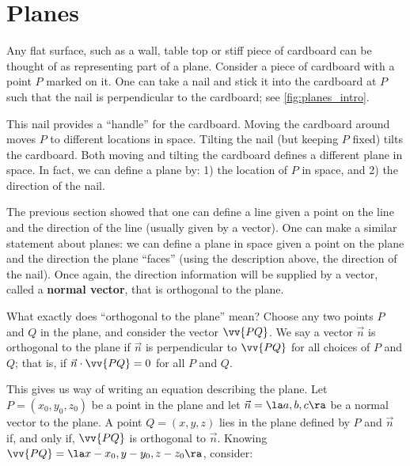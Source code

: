 \section{Planes}\label{sec:planes}

Any flat surface, such as a wall, table top or stiff piece of cardboard can be thought of as representing part of a plane. Consider a piece of cardboard with a point $P$ marked on it. One can take a nail and stick it into the cardboard at $P$ such that the nail is perpendicular to the cardboard; see \autoref{fig:planes_intro}.%

This nail provides a ``handle'' for the cardboard. Moving the cardboard around moves $P$ to different locations in space. Tilting the nail (but keeping $P$ fixed) tilts the cardboard. Both moving and tilting the cardboard defines a different plane in space. In fact, we can define a plane by: 1) the location of $P$ in space, and 2) the direction of the nail.

The previous section showed that one can define a line given a point on the line and the direction of the line (usually given by a vector). One can make a similar statement about planes: we can define a plane in space given a point on the plane and the direction the plane ``faces'' (using the description above, the direction of the nail). Once again, the direction information will be supplied by a vector, called a \textbf{normal vector}, that is orthogonal to the plane.

What exactly does ``orthogonal to the plane'' mean? Choose any two points $P$ and $Q$ in the plane, and consider the vector $\vv{PQ}$. We say a vector $\vec n$ is orthogonal to the plane if $\vec n$ is perpendicular to $\vv{PQ}$ for all choices of $P$ and $Q$; that is, if $\vec n\cdot \vv{PQ}=0$ for all $P$ and $Q$.

This gives us way of writing an equation describing the plane. Let $P=(x_0,y_0,z_0)$ be a point in the plane and let $\vec n = \la a,b,c\ra $ be a normal vector to the plane. A point $Q = (x,y,z)$ lies in the plane defined by $P$ and $\vec n$ if, and only if, $\vv{PQ}$ is orthogonal to $\vec n$. Knowing $\vv{PQ} = \la x-x_0,y-y_0,z-z_0\ra$, consider:

